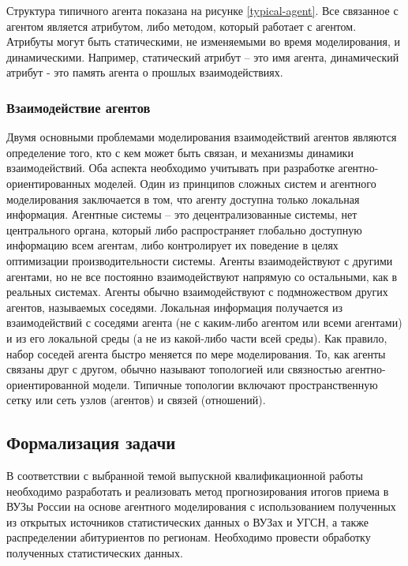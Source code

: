 Структура типичного агента показана на рисунке \ref{typical-agent}.  Все связанное с агентом является атрибутом, либо методом, который работает с агентом. Атрибуты могут быть статическими, не изменяемыми во время моделирования, и динамическими. Например, статический атрибут – это имя агента, динамический атрибут - это память агента о прошлых взаимодействиях.


\subsubsection{Взаимодействие агентов}

Двумя основными проблемами моделирования взаимодействий агентов являются определение того, кто с кем может быть связан, и механизмы динамики взаимодействий. Оба аспекта необходимо учитывать при разработке агентно-ориентированных моделей. Один из принципов сложных систем и агентного моделирования заключается в том, что агенту доступна только локальная информация. Агентные системы – это децентрализованные системы, нет центрального органа, который либо распространяет глобально доступную информацию всем агентам, либо контролирует их поведение в целях оптимизации производительности системы. Агенты взаимодействуют с другими агентами, но не все постоянно взаимодействуют напрямую со остальными, как в реальных системах. Агенты обычно взаимодействуют с подмножеством других агентов, называемых соседями. Локальная информация получается из взаимодействий с соседями агента (не с каким-либо агентом или всеми агентами) и из его локальной среды (а не из какой-либо части всей среды). Как правило, набор соседей агента быстро меняется по мере моделирования. То, как агенты связаны друг с другом, обычно называют топологией или связностью агентно-ориентированной модели. Типичные топологии включают пространственную сетку или сеть узлов (агентов) и связей (отношений).

\subsection{Формализация задачи}

В соответствии с выбранной темой выпускной квалификационной работы необходимо разработать и реализовать метод прогнозирования итогов
приема в ВУЗы России на основе агентного моделирования с использованием полученных из открытых источников статистических данных о ВУЗах и УГСН, а также распределении абитуриентов по регионам. Необходимо провести обработку полученных статистических данных. 

